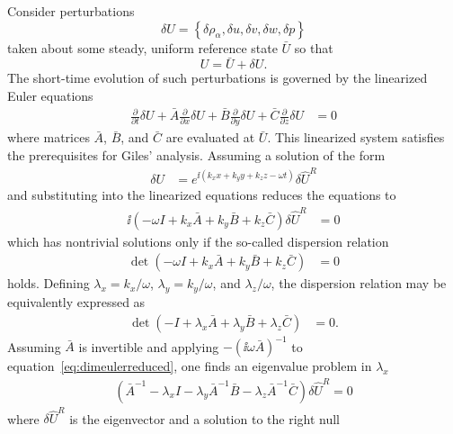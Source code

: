Consider perturbations
\[
\delta{}U = \left\{ \delta{}\rho_\alpha, \delta{}u,
\delta{}v, \delta{}w, \delta{}p \right\}
\]
taken about some steady,
uniform reference state $\bar{U}$ so that
\[
U = \bar{U} + \delta{}U.
\]
The short-time evolution of such perturbations is governed by the linearized
Euler equations
\begin{align}
\label{eq:dimeulerperturb}
               \frac{\partial}{\partial{}t}\delta{}U
+ \bar{A} \frac{\partial}{\partial{}x}\delta{}U
+ \bar{B} \frac{\partial}{\partial{}y}\delta{}U
+ \bar{C} \frac{\partial}{\partial{}z}\delta{}U
&= 0
\end{align}
where matrices $\bar{A}$, $\bar{B}$, and $\bar{C}$ are evaluated
at $\bar{U}$.  This linearized system satisfies the prerequisites for
Giles' analysis.  Assuming a solution of the form
\begin{align}
  \delta{}U &= e^{\ii\left(
    k_x x + k_y y + k_z z - \omega t
  \right)}
  \delta\hat{U}^R
\end{align}
and substituting into the linearized equations reduces the equations to
\begin{align}
\label{eq:dimeulerreduced}
  \ii\left( - \omega I
            + k_x \bar{A}
            + k_y \bar{B}
            + k_z \bar{C}
  \right)
  \delta\hat{U}^R &= 0
\end{align}
which has nontrivial solutions only if the so-called dispersion relation
\begin{align}
  \det \left( - \omega I
              + k_x \bar{A}
              + k_y \bar{B}
              + k_z \bar{C}
       \right) &= 0
\end{align}
holds.  Defining $\lambda_x = k_x/\omega$, $\lambda_y = k_y/\omega$, and
$\lambda_z/\omega$, the dispersion relation may be equivalently expressed as
\begin{align}
\label{eq:dimeulerdisp}
  \det \left( - I
              + \lambda_x \bar{A}
              + \lambda_y \bar{B}
              + \lambda_z \bar{C}
       \right) &= 0
  .
\end{align}
Assuming $\bar{A}$ is invertible and applying
$-\left(\ii\omega{}\bar{A}\right)^{-1}$ to
equation~\eqref{eq:dimeulerreduced}, one finds an eigenvalue problem in
$\lambda_x$
\begin{align}
  \left(   \bar{A}^{-1}
         - \lambda_x I
         - \lambda_y \bar{A}^{-1} \bar{B}
         - \lambda_z \bar{A}^{-1} \bar{C}
  \right) \delta\hat{U}^R = 0
\end{align}
where $\delta\hat{U}^R$ is the eigenvector and a solution to the right null
